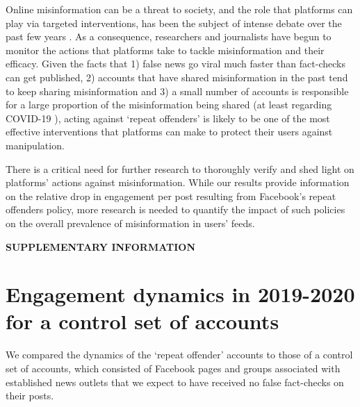 \documentclass[review]{elsarticle}
\newcommand{\beginsupplement}{%
        \setcounter{table}{0}
        \renewcommand{\thetable}{S\arabic{table}}%
        \setcounter{figure}{0}
        \renewcommand{\thefigure}{S\arabic{figure}}%
     }
\begin{document}
{Online misinformation can be a threat to society, and the role that platforms can play via targeted interventions, has been the subject of intense debate over the past few years \citep{rogers2020deplatforming}. 
As a consequence, researchers \citep{mena2020cleaning, yaqub2020effects} and journalists \citep{FacebookPartisanBias, FacebookCivilityGrowth} have begun to monitor the actions that platforms take to tackle misinformation and their efficacy.
Given the facts that 1) false news go viral much faster than fact-checks can get published, 2) accounts that have shared misinformation in the past tend to keep sharing misinformation and 3) a small number of accounts is responsible for a large proportion of the misinformation being shared (at least regarding COVID-19 \citep{disinformationDozen}), acting against `repeat offenders' is likely to be one of the most effective interventions that platforms can make to protect their users against manipulation.

There is a critical need for further research to thoroughly verify and shed light on platforms' actions against misinformation. 
While our results provide information on the relative drop in engagement per post resulting from Facebook’s repeat offenders policy, more research is needed to quantify the impact of such policies on the overall prevalence of misinformation in users’ feeds.




\newpage

\beginsupplement

\textbf{SUPPLEMENTARY INFORMATION}

\section*{Engagement dynamics in 2019-2020 for a control set of accounts}

We compared the dynamics of the `repeat offender' accounts to those of a control set of accounts, which consisted of Facebook pages and groups associated with established news outlets that we expect to have received no false fact-checks on their posts.

}
\end{document}
